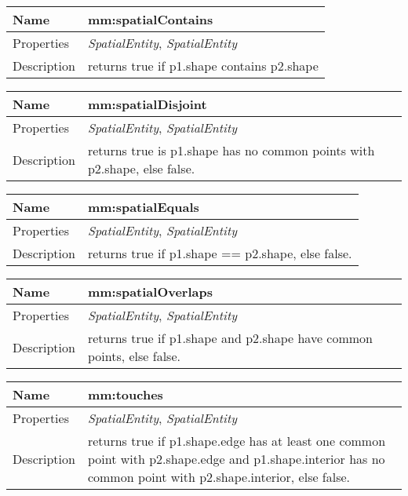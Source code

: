 \vspace{0.3cm}
\newline
\begin{tabular}{|p{3cm}|p{10cm}|}
\hline Name & mm:spatialContains\\
\hline Properties & \textit{SpatialEntity}, \textit{SpatialEntity} \\
\hline Description & returns true if p1.shape contains p2.shape\\
\hline
\end{tabular}
\vspace{0.3cm}
\newline
\begin{tabular}{|p{3cm}|p{10cm}|}
\hline Name & mm:spatialDisjoint\\
\hline Properties & \textit{SpatialEntity}, \textit{SpatialEntity} \\
\hline Description & returns true is p1.shape has no common points with p2.shape, else false.\\
\hline
\end{tabular}
\vspace{0.3cm}
\newline
\begin{tabular}{|p{3cm}|p{10cm}|}
\hline Name & mm:spatialEquals\\
\hline Properties & \textit{SpatialEntity}, \textit{SpatialEntity} \\
\hline Description & returns true if p1.shape == p2.shape, else false.\\
\hline
\end{tabular}
\vspace{0.3cm}
\newline
\begin{tabular}{|p{3cm}|p{10cm}|}
\hline Name & mm:spatialOverlaps\\
\hline Properties & \textit{SpatialEntity}, \textit{SpatialEntity} \\
\hline Description & returns true if p1.shape and p2.shape have common points, else false.\\
\hline
\end{tabular}
\vspace{0.3cm}
\newline
\begin{tabular}{|p{3cm}|p{10cm}|}
\hline Name & mm:touches\\
\hline Properties & \textit{SpatialEntity}, \textit{SpatialEntity} \\
\hline Description & returns true if p1.shape.edge has at least one common point with p2.shape.edge and p1.shape.interior has no common point with p2.shape.interior, else false.\\
\hline
\end{tabular}
\vspace{0.3cm}
\newline
